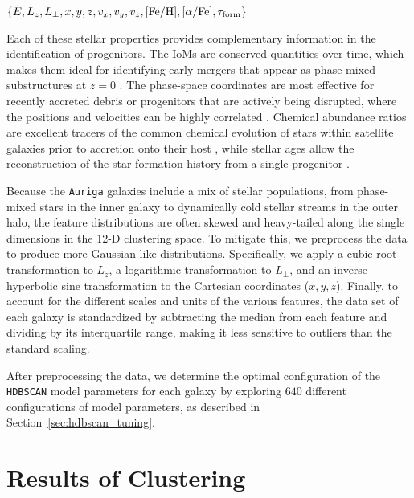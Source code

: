 $\{{E, L_z, L_{\perp}, x, y, z, v_x, v_y, v_z, {\rm [Fe/H]}, [\alpha/{\rm Fe}], \tau_{\rm form}} \}$

Each of these stellar properties provides complementary information in the identification of progenitors. The IoMs are conserved quantities over time, which makes them ideal for identifying early mergers that appear as phase-mixed substructures at $z=0$ \citep{Helmi1999a}. The phase-space coordinates are most effective for recently accreted debris or progenitors that are actively being disrupted, where the positions and velocities can be highly correlated \citep{Johnston2008}. Chemical abundance ratios are excellent tracers of the common chemical evolution of stars within satellite galaxies prior to accretion onto their host \citep{Freeman2002}, while stellar ages allow the reconstruction of the star formation history from a single progenitor \citep{Montalban2021,Gallart2024}.


Because the \texttt{Auriga} galaxies include a mix of stellar populations, from phase-mixed stars in the inner galaxy to dynamically cold stellar streams in the outer halo, the feature distributions are often skewed and heavy-tailed along the single dimensions in the 12-D clustering space. To mitigate this, we preprocess the data to produce more Gaussian-like distributions. Specifically, we apply a cubic-root transformation to $L_z$, a logarithmic transformation to $L_{\perp}$, and an inverse hyperbolic sine transformation to the Cartesian coordinates ($x, y, z$). Finally, to account for the different scales and units of the various features, the data set of each galaxy is standardized by subtracting the median from each feature and dividing by its interquartile range, making it less sensitive to outliers than the standard scaling.

After preprocessing the data, we determine the optimal configuration of the \texttt{HDBSCAN} model parameters for each galaxy by exploring $640$ different configurations of model parameters, as described in Section~\ref{sec:hdbscan_tuning}.

\section{Results of Clustering}
\label{sec:results}

